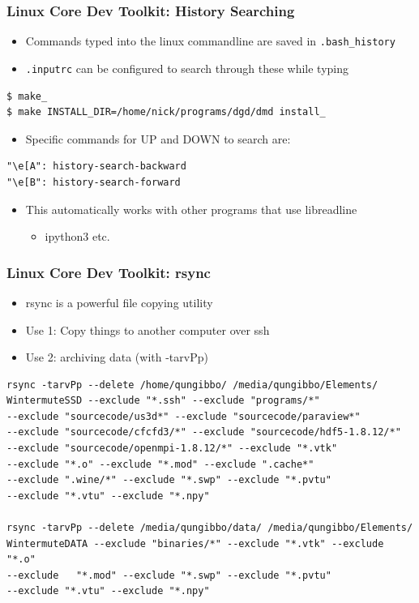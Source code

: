 \documentclass[landscape,10pt]{beamer}
\begin{document}
\begin{frame}[fragile]
\frametitle{Linux Core Dev Toolkit: History Searching}
\begin{itemize}
\item Commands typed into the linux commandline are saved in \texttt{.bash\_history}
\item \texttt{.inputrc} can be configured to search through these while typing
\end{itemize}

\begin{verbatim}
$ make_
$ make INSTALL_DIR=/home/nick/programs/dgd/dmd install_
\end{verbatim}

\begin{itemize}
\item Specific commands for UP and DOWN to search are:
\end{itemize}
\begin{verbatim}
"\e[A": history-search-backward
"\e[B": history-search-forward
\end{verbatim}

\begin{itemize}
\item This automatically works with other programs that use libreadline
\begin{itemize}
\item ipython3 etc.
\end{itemize}
\end{itemize}

\end{frame}

\begin{frame}[fragile]
\frametitle{Linux Core Dev Toolkit: rsync}
\begin{itemize}
\item rsync is a powerful file copying utility
\item Use 1: Copy things to another computer over ssh
\item Use 2: archiving data (with -tarvPp)
\end{itemize}
 
\begin{scriptsize}
\begin{verbatim}
rsync -tarvPp --delete /home/qungibbo/ /media/qungibbo/Elements/
WintermuteSSD --exclude "*.ssh" --exclude "programs/*"
--exclude "sourcecode/us3d*" --exclude "sourcecode/paraview*"
--exclude "sourcecode/cfcfd3/*" --exclude "sourcecode/hdf5-1.8.12/*"
--exclude "sourcecode/openmpi-1.8.12/*" --exclude "*.vtk"
--exclude "*.o" --exclude "*.mod" --exclude ".cache*"
--exclude ".wine/*" --exclude "*.swp" --exclude "*.pvtu"
--exclude "*.vtu" --exclude "*.npy"

rsync -tarvPp --delete /media/qungibbo/data/ /media/qungibbo/Elements/
WintermuteDATA --exclude "binaries/*" --exclude "*.vtk" --exclude "*.o"
--exclude   "*.mod" --exclude "*.swp" --exclude "*.pvtu"
--exclude "*.vtu" --exclude "*.npy"
\end{verbatim}
\end{scriptsize}

\end{frame}
\end{document}
